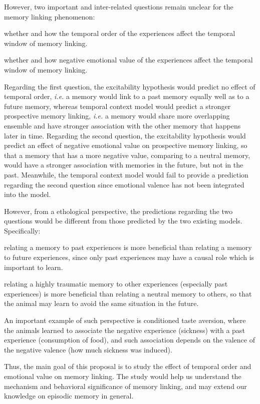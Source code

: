 \documentclass[master.tex]{subfiles}
\begin{document}
However, two important and inter-related questions remain unclear for the
memory linking phenomenon:
\begin{inparaenum}[a)] \bfseries
\item whether and how the temporal order of the experiences affect the temporal
  window of memory linking.
\item whether and how negative emotional value of the experiences affect the
  temporal window of memory linking.
\end{inparaenum}
Regarding the first question, the excitability hypothesis would predict no
effect of temporal order, \textit{i.e.} a memory would link to a past memory
equally well as to a future memory, whereas temporal context model would predict
a stronger prospective memory linking, \textit{i.e.} a memory would share more
overlapping ensemble and have stronger association with the other memory that
happens later in time. Regarding the second question, the excitability
hypothesis would predict an effect of negative emotional value on prospective
memory linking, so that a memory that has a more negative value, comparing to a
neutral memory, would have a stronger association with memories in the future,
but not in the past. Meanwhile, the temporal context model would fail to provide
a prediction regarding the second question since emotional valence has not been
integrated into the model.

However, from a ethological perspective, the predictions regarding the two
questions would be different from those predicted by the two existing models.
Specifically:
\begin{inparaenum}[a)]
\item relating a memory to past experiences is more beneficial than relating a
  memory to future experiences, since only past experiences may have a causal
  role which is important to learn.
\item relating a highly traumatic memory to other experiences (especially past
  experiences) is more beneficial than relating a neutral memory to others, so
  that the animal may learn to avoid the same situation in the future.
\end{inparaenum}
An important example of such perspective is conditioned taste aversion, where
the animals learned to associate the negative experience (sickness) with a past
experience (consumption of food), and such association depends on the valence of
the negative valence (how much sickness was induced).

Thus, the main goal of this proposal is to study the effect of temporal order
and emotional value on memory linking. The study would help us understand the
mechanism and behavioral significance of memory linking, and may extend our
knowledge on episodic memory in general.
\end{document}
